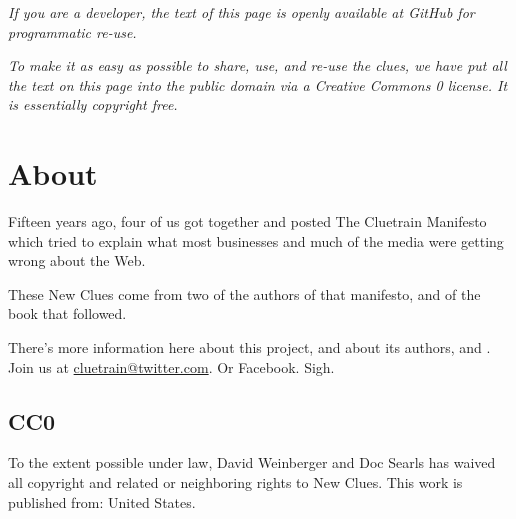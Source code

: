 \documentclass[letterpaper,12pt,english]{sphinxmanual}
\begin{document}
\emph{If you are a developer, the text of this page is openly available at GitHub for programmatic re-use.}

\emph{To make it as easy as possible to share, use, and re-use the clues, we have put all the text on this page into the public domain via a Creative Commons 0 license. It is essentially copyright free.}


\section{About}
\label{2015newclues:about}
Fifteen years ago, four of us got together and posted The Cluetrain Manifesto which tried to explain what most businesses and much of the media were getting wrong about the Web.

These New Clues come from two of the authors of that manifesto, and of the book that followed.

There's more information here about this project, and about its authors, and .
Join us at \href{mailto:cluetrain@twitter.com}{cluetrain@twitter.com}. Or Facebook. Sigh.


\subsection{CC0}
\label{2015newclues:cc0}
To the extent possible under law, David Weinberger and Doc Searls has waived all copyright and related or neighboring rights to New Clues. This work is published from: United States.
\end{document}
